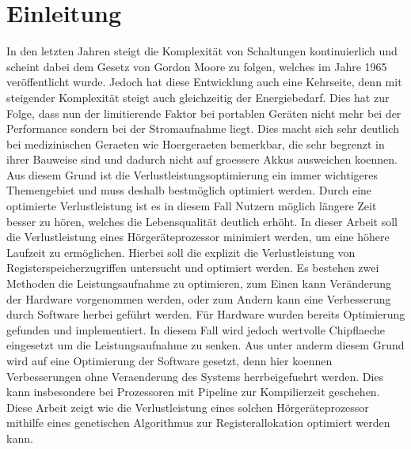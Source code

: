 
\thispagestyle{empty}
%
\chapter{Einleitung}
\label{chap:introduction}
In den letzten Jahren steigt die Komplexität von Schaltungen kontinuierlich und scheint dabei dem Gesetz von Gordon Moore zu folgen, welches im Jahre 1965 veröffentlicht wurde. Jedoch hat diese Entwicklung auch eine Kehrseite, denn mit steigender Komplexität steigt auch gleichzeitig der Energiebedarf. Dies hat zur Folge, dass nun der limitierende Faktor bei portablen Geräten nicht mehr bei der Performance sondern bei der Stromaufnahme liegt. Dies macht sich sehr deutlich bei medizinischen Geraeten wie Hoergeraeten bemerkbar, die sehr begrenzt in ihrer Bauweise sind und dadurch nicht auf groessere Akkus ausweichen koennen. Aus diesem Grund ist die Verlustleistungsoptimierung ein immer wichtigeres Themengebiet und muss deshalb bestmöglich optimiert werden. Durch eine optimierte Verlustleistung ist es in diesem Fall Nutzern möglich längere Zeit besser zu hören, welches die Lebensqualität deutlich erhöht.
In dieser Arbeit soll die Verlustleistung eines Hörgeräteprozessor minimiert werden, um eine höhere Laufzeit zu ermöglichen. Hierbei soll die explizit die Verlustleistung von Registerspeicherzugriffen untersucht und optimiert werden. 
Es bestehen zwei Methoden die Leistungsaufnahme zu optimieren, zum Einen kann Veränderung der Hardware vorgenommen werden, oder zum Andern kann eine Verbesserung durch Software herbei geführt werden. Für Hardware wurden bereits Optimierung gefunden und implementiert. In diesem Fall wird jedoch wertvolle Chipflaeche eingesetzt um die Leistungsaufnahme zu senken. Aus unter anderm diesem Grund wird auf eine Optimierung der Software gesetzt, denn hier koennen Verbesserungen ohne Veraenderung des Systems herrbeigefuehrt werden. Dies kann insbesondere bei Prozessoren mit Pipeline zur Kompilierzeit geschehen. 
Diese Arbeit zeigt wie die Verlustleistung eines solchen Hörgeräteprozessor mithilfe eines genetischen Algorithmus zur Registerallokation optimiert werden kann.


